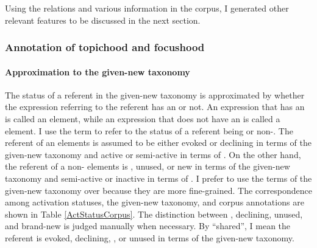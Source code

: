 Using the  relations and various information in the corpus,
I generated other relevant features to be discussed in the next section.

\subsubsection{Annotation of topichood and focushood}\label{FW:Cor:TopFoc}

\paragraph{Approximation to the given-new taxonomy}

The status of a referent in the given-new taxonomy is approximated by
whether the expression referring to the referent has an  or not.
An expression that has an  is called an  element,
while an expression that does not have an  is called a  element.
I use the term  to refer to the status of a referent being  or non-.
The referent of an  elements is assumed to be either evoked or declining in terms of the given-new taxonomy and active or semi-active in terms of .
On the other hand, the referent of a non- elements is , unused, or new in terms of the given-new taxonomy and
semi-active or inactive in terms of .
I prefer to use the terms of the given-new taxonomy over  because
they are more fine-grained.
The correspondence among activation statuses, the given-new taxonomy, and corpus annotations are shown in Table \ref{ActStatusCorpus}.
The distinction between , declining, unused, and brand-new is judged manually when necessary.
By ``shared'', I mean the referent is evoked, declining, , or unused in terms of the given-new taxonomy.

